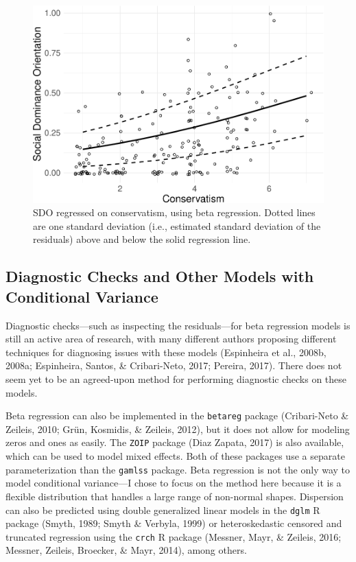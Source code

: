 \documentclass[english,,man]{apa6}
\begin{document}
\begin{figure}
\centering
\includegraphics{beta_hurdle_files/figure-latex/unnamed-chunk-19-1.pdf}
\caption{\label{fig:unnamed-chunk-19}SDO regressed on conservatism, using beta regression. Dotted lines are one standard deviation (i.e., estimated standard deviation of the residuals) above and below the solid regression line.}
\end{figure}

\hypertarget{diagnostic-checks-and-other-models-with-conditional-variance}{%
\subsection{Diagnostic Checks and Other Models with Conditional Variance}\label{diagnostic-checks-and-other-models-with-conditional-variance}}

Diagnostic checks---such as inspecting the residuals---for beta regression models is still an active area of research, with many different authors proposing different techniques for diagnosing issues with these models (Espinheira et al., 2008b, 2008a; Espinheira, Santos, \& Cribari-Neto, 2017; Pereira, 2017). There does not seem yet to be an agreed-upon method for performing diagnostic checks on these models.

Beta regression can also be implemented in the \texttt{betareg} package (Cribari-Neto \& Zeileis, 2010; Grün, Kosmidis, \& Zeileis, 2012), but it does not allow for modeling zeros and ones as easily. The \texttt{ZOIP} package (Diaz Zapata, 2017) is also available, which can be used to model mixed effects. Both of these packages use a separate parameterization than the \texttt{gamlss} package. Beta regression is not the only way to model conditional variance---I chose to focus on the method here because it is a flexible distribution that handles a large range of non-normal shapes. Dispersion can also be predicted using double generalized linear models in the \texttt{dglm} R package (Smyth, 1989; Smyth \& Verbyla, 1999) or heteroskedastic censored and truncated regression using the \texttt{crch} R package (Messner, Mayr, \& Zeileis, 2016; Messner, Zeileis, Broecker, \& Mayr, 2014), among others.
\end{document}
